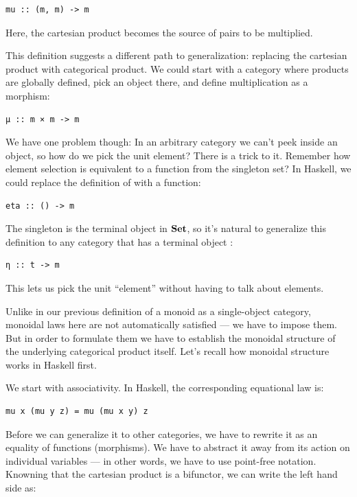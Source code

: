 \begin{Verbatim}[commandchars=\\\{\}]
mu :: (m, m) -> m
\end{Verbatim}
Here, the cartesian product  becomes the source of pairs
to be multiplied.

This definition suggests a different path to generalization: replacing
the cartesian product with categorical product. We could start with a
category where products are globally defined, pick an object 
there, and define multiplication as a morphism:

\begin{Verbatim}[commandchars=\\\{\}]
μ :: m × m -> m
\end{Verbatim}
We have one problem though: In an arbitrary category we can't peek
inside an object, so how do we pick the unit element? There is a trick
to it. Remember how element selection is equivalent to a function from
the singleton set? In Haskell, we could replace the definition of
 with a function:

\begin{Verbatim}[commandchars=\\\{\}]
eta :: () -> m
\end{Verbatim}
The singleton is the terminal object in $\mathbf{Set}$, so it's natural to
generalize this definition to any category that has a terminal object
:

\begin{Verbatim}[commandchars=\\\{\}]
η :: t -> m
\end{Verbatim}
This lets us pick the unit ``element'' without having to talk about
elements.

Unlike in our previous definition of a monoid as a single-object
category, monoidal laws here are not automatically satisfied --- we have
to impose them. But in order to formulate them we have to establish the
monoidal structure of the underlying categorical product itself. Let's
recall how monoidal structure works in Haskell first.

We start with associativity. In Haskell, the corresponding equational
law is:

\begin{Verbatim}[commandchars=\\\{\}]
mu x (mu y z) = mu (mu x y) z
\end{Verbatim}
Before we can generalize it to other categories, we have to rewrite it
as an equality of functions (morphisms). We have to abstract it away
from its action on individual variables --- in other words, we have to
use point-free notation. Knowning that the cartesian product is a
bifunctor, we can write the left hand side as:

